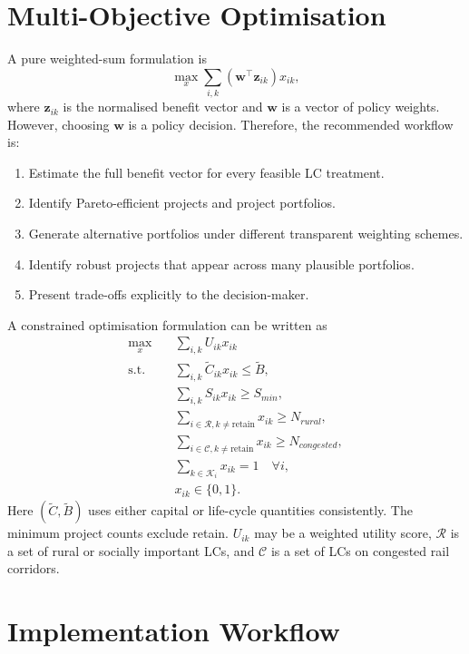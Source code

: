 \documentclass[11pt,a4paper]{article}
\begin{document}
\section{Multi-Objective Optimisation}

A pure weighted-sum formulation is
\begin{equation}
\max_x \sum_{i,k} \left(\mathbf{w}^\top\mathbf{z}_{ik}\right)x_{ik},
\end{equation}
where $\mathbf{z}_{ik}$ is the normalised benefit vector and $\mathbf{w}$ is a vector of policy weights. However, choosing $\mathbf{w}$ is a policy decision. Therefore, the recommended workflow is:

\begin{enumerate}[label=\arabic*.]
\item Estimate the full benefit vector for every feasible LC treatment.
\item Identify Pareto-efficient projects and project portfolios.
\item Generate alternative portfolios under different transparent weighting schemes.
\item Identify robust projects that appear across many plausible portfolios.
\item Present trade-offs explicitly to the decision-maker.
\end{enumerate}

A constrained optimisation formulation can be written as
\begin{align}
\max_x \quad & \sum_{i,k} U_{ik}x_{ik}\\
\text{s.t.}\quad & \sum_{i,k} \widetilde C_{ik}x_{ik}\leq \widetilde B,\\
& \sum_{i,k} S_{ik}x_{ik}\geq S_{min},\\
& \sum_{i\in\mathcal{R},k\ne\mathrm{retain}} x_{ik}\geq N_{rural},\\
& \sum_{i\in\mathcal{C},k\ne\mathrm{retain}} x_{ik}\geq N_{congested},\\
& \sum_{k\in\mathcal{K}_i}x_{ik}=1 \quad \forall i,\\
& x_{ik}\in\{0,1\}.
\end{align}
Here $(\widetilde C,\widetilde B)$ uses either capital or life-cycle quantities consistently. The minimum project counts exclude retain. $U_{ik}$ may be a weighted utility score, $\mathcal{R}$ is a set of rural or socially important LCs, and $\mathcal{C}$ is a set of LCs on congested rail corridors.

\section{Implementation Workflow}
\end{document}
